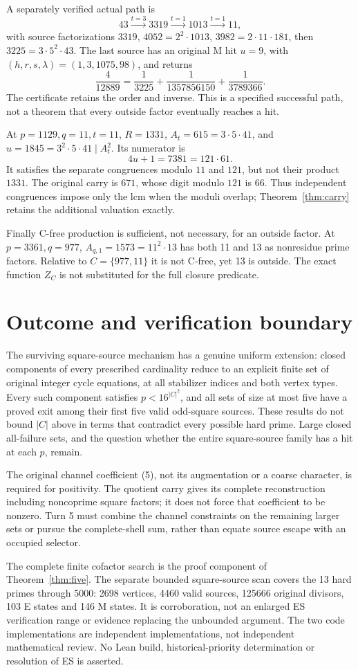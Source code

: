 A separately verified actual path is
\[
 43\xrightarrow{t=3}3319\xrightarrow{t=1}1013
 \xrightarrow{t=1}11,
\]
with source factorizations $3319$, $4052=2^2\cdot1013$,
$3982=2\cdot11\cdot181$, then $3225=3\cdot5^2\cdot43$.
The last source has an original M hit $u=9$, with
$(h,r,s,\lambda)=(1,3,1075,98)$, and returns
\[
 \frac4{12889}=\frac1{3225}+\frac1{1357856150}+\frac1{3789366}.
\]
The certificate retains the order and inverse. This is a specified successful path, not a theorem that
every outside factor eventually reaches a hit.

At $p=1129,q=11,t=11$, $R=1331$, $A_t=615=3\cdot5\cdot41$, and
$u=1845=3^2\cdot5\cdot41\mid A_t^2$. Its numerator is
\[
 4u+1=7381=121\cdot61.
\]
It satisfies the separate congruences modulo $11$ and $121$, but not their product
$1331$. The original carry is $671$, whose digit modulo $121$ is $66$.
Thus independent congruences impose only the lcm when the moduli overlap;
Theorem~\ref{thm:carry} retains the additional valuation exactly.

Finally C-free production is sufficient, not necessary, for an outside factor.
At $p=3361,q=977$, $A_{q,1}=1573=11^2\cdot13$ has both 11 and 13 as nonresidue
prime factors. Relative to $C=\{977,11\}$ it is not C-free, yet 13 is outside.
The exact function $Z_C$ is not substituted for the full closure predicate.

\section{Outcome and verification boundary}
The surviving square-source mechanism has a genuine uniform extension:
closed components of every prescribed cardinality reduce to an explicit finite
set of original integer cycle equations, at all stabilizer indices and both
vertex types. Every such component satisfies $p<16^{|C|^2}$, and all sets of
size at most five have a proved exit among their first five valid odd-square sources. These results do not bound $|C|$ above in terms
that contradict every possible hard prime. Large closed all-failure sets, and the
question whether the entire square-source family has a hit at each $p$, remain.

The original channel coefficient (5), not its augmentation or a coarse character,
is required for positivity. The quotient carry gives its complete reconstruction
including noncoprime square factors; it does not force that coefficient to be
nonzero. Turn 5 must combine the channel constraints on the remaining larger
sets or pursue the complete-shell sum, rather than equate source escape with an
occupied selector.

The complete finite cofactor search is the proof component of
Theorem~\ref{thm:five}. The separate bounded square-source scan covers the 13 hard
primes through 5000: 2698 vertices, 4460 valid sources, 125666 original divisors,
103 E states and 146 M states. It is corroboration, not an enlarged ES verification
range or evidence replacing the unbounded argument. The two code implementations
are independent implementations, not independent mathematical review. No Lean
build, historical-priority determination or resolution of ES is asserted.
